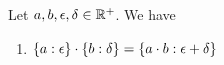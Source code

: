 \begin{theorem} \label{thm:multiplicative:rules}
  Let $a,b,\epsilon,\delta \in\Rplus$. We have

  \begin{enumerate}
    \item $\ean[\epsilon]{a} \cdot \ean[\delta]{b} = \ean[\epsilon+\delta]{a\cdot b}$
  \end{enumerate}
\end{theorem}
